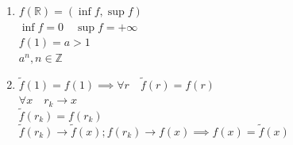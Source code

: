 \documentclass{article}
\begin{document}
\begin{enumerate}
    \item $f(\mathbb{R}) = (\inf{f}, \sup{f})$\\
    $\inf{f} = 0 \quad \sup{f} = +\infty$\\
    $f(1) = a > 1$\\
    $a^n, n\in \mathbb{Z}$
    
    \item $\tilde f(1) = f(1) \implies \forall r \quad \tilde f(r) = f(r)$\\
    $\forall x \quad r_k \rightarrow x$\\
    $\tilde f(r_k) = f(r_k)$\\
    $\tilde f(r_k) \rightarrow \tilde f(x); f(r_k) \rightarrow f(x) \implies f(x) = \tilde f(x)$
\end{enumerate}
\end{document}
